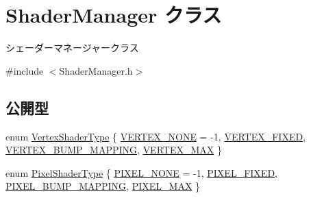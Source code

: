 \hypertarget{class_shader_manager}{}\section{Shader\+Manager クラス}
\label{class_shader_manager}


シェーダーマネージャークラス  




{\ttfamily \#include $<$Shader\+Manager.\+h$>$}

\subsection*{公開型}
\begin{DoxyCompactItemize}
\item 
enum \mbox{\hyperlink{class_shader_manager_a9b51e49d70eb3cc58f6d1f3994e8cfbd}{Vertex\+Shader\+Type}} \{ \mbox{\hyperlink{class_shader_manager_a9b51e49d70eb3cc58f6d1f3994e8cfbdaf0212c589f47f880608c317e6fcbdfab}{V\+E\+R\+T\+E\+X\+\_\+\+N\+O\+NE}} = -\/1, 
\mbox{\hyperlink{class_shader_manager_a9b51e49d70eb3cc58f6d1f3994e8cfbda66ffcf3d89e817f5cad6b8f8eda5fd71}{V\+E\+R\+T\+E\+X\+\_\+\+F\+I\+X\+ED}}, 
\mbox{\hyperlink{class_shader_manager_a9b51e49d70eb3cc58f6d1f3994e8cfbda6ecdb0c0fcd8c61e0c0d494a99e3a8d8}{V\+E\+R\+T\+E\+X\+\_\+\+B\+U\+M\+P\+\_\+\+M\+A\+P\+P\+I\+NG}}, 
\mbox{\hyperlink{class_shader_manager_a9b51e49d70eb3cc58f6d1f3994e8cfbda2a90d8502c5060ffb7b4a7d1c1f0e940}{V\+E\+R\+T\+E\+X\+\_\+\+M\+AX}}
 \}
\item 
enum \mbox{\hyperlink{class_shader_manager_a7d15d773b3c6a99dd7086c45c8b0be5f}{Pixel\+Shader\+Type}} \{ \mbox{\hyperlink{class_shader_manager_a7d15d773b3c6a99dd7086c45c8b0be5fa73495baa0c47ac751cce0e3385fa80dd}{P\+I\+X\+E\+L\+\_\+\+N\+O\+NE}} = -\/1, 
\mbox{\hyperlink{class_shader_manager_a7d15d773b3c6a99dd7086c45c8b0be5fa1c9cf819d7e5efbe184309a4702824f1}{P\+I\+X\+E\+L\+\_\+\+F\+I\+X\+ED}}, 
\mbox{\hyperlink{class_shader_manager_a7d15d773b3c6a99dd7086c45c8b0be5fa3acd691a58d74a2ab3430e644c6ef0da}{P\+I\+X\+E\+L\+\_\+\+B\+U\+M\+P\+\_\+\+M\+A\+P\+P\+I\+NG}}, 
\mbox{\hyperlink{class_shader_manager_a7d15d773b3c6a99dd7086c45c8b0be5fa9281ee100f356fae9f9432679705bb9e}{P\+I\+X\+E\+L\+\_\+\+M\+AX}}
 \}
\end{DoxyCompactItemize}
